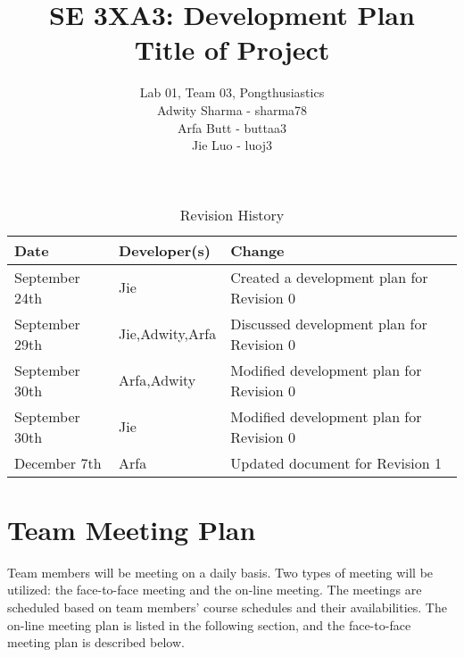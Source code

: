 \documentclass{article}
\title{SE 3XA3: Development Plan\\Title of Project}
\author{Lab 01, Team 03, Pongthusiastics 		
\\ Adwity Sharma - sharma78 		
\\ Arfa Butt - buttaa3 	
	\\ Jie Luo - luoj3 }
\date{}
\begin{document}
 
\begin{table}[hp]
 \caption{Revision History} \label{TblRevisionHistory} 
\begin{tabularx}{\textwidth}{llX} 
\toprule
 \textbf{Date} & \textbf{Developer(s)} & \textbf{Change}\\ 
\midrule 
September 24th & Jie  & Created a development plan for Revision 0\\ 
September 29th & Jie,Adwity,Arfa & Discussed development plan for Revision 0\\ 
September 30th & Arfa,Adwity & Modified development plan for Revision 0\\ 
September 30th & Jie  & Modified development plan for Revision 0\\ 
December 7th & Arfa & Updated document for Revision 1\\
\bottomrule
 \end{tabularx} 
\end{table} 
\newpage 
\maketitle


\section {Team Meeting Plan} 

Team members will be meeting on a daily basis. Two types of meeting will be utilized: the face-to-face meeting and the on-line meeting. The meetings are scheduled based on team members' course schedules and their availabilities. The on-line meeting plan is listed in the following section, and the face-to-face meeting plan is described below.\\
\end{document}
